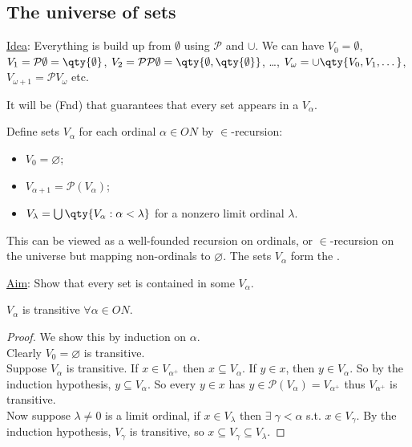 \subsection{The universe of sets}

\underline{Idea}: Everything is build up from $\emptyset$ using $\mathcal{P}$ and $\cup$.
We can have $V_0 = \emptyset$, $V_1 = \mathcal{P} \emptyset = \qty{\emptyset}$, $V_2 = \mathcal{P} \mathcal{P} \emptyset = \qty{\emptyset, \qty{\emptyset}}$, \dots, $V_\omega = \cup \qty{V_0, V_1, \dots}$, $V_{\omega + 1} = \mathcal{P} V_\omega$ etc.

It will be (Fnd) that guarantees that every set appears in a $V_\alpha$.

Define sets $V_\alpha$ for each ordinal $\alpha \in ON$ by $\in$-recursion:
\begin{itemize}
    \item $V_0 = \varnothing$;
    \item $V_{\alpha+1} = \mathcal P(V_\alpha)$;
    \item $V_\lambda = \bigcup \qty{V_\alpha : \alpha < \lambda}$ for a nonzero limit ordinal $\lambda$.
\end{itemize}
This can be viewed as a well-founded recursion on ordinals, or $\in$-recursion on the universe but mapping non-ordinals to $\varnothing$.
The sets $V_\alpha$ form the .

\underline{Aim}: Show that every set is contained in some $V_\alpha$.

\begin{lemma} \label{lem:5-6}
    $V_\alpha$ is transitive $\forall \alpha \in ON$.
\end{lemma}

\begin{proof}
    We show this by induction on $\alpha$. \\
    Clearly $V_0 = \varnothing$ is transitive. \\
    Suppose $V_\alpha$ is transitive.
    If $x \in V_{\alpha^+}$ then $x \subseteq V_\alpha$.
    If $y \in x$, then $y \in V_\alpha$.
    So by the induction hypothesis, $y \subseteq V_\alpha$.
    So every $y \in x$ has $y \in \mathcal{P}(V_\alpha) = V_{\alpha^+}$ thus $V_{\alpha^+}$ is transitive. \\
    Now suppose $\lambda \neq 0$ is a limit ordinal, if $x \in V_\lambda$ then $\exists \; \gamma < \alpha$ s.t. $x \in V_\gamma$.
    By the induction hypothesis, $V_\gamma$ is transitive, so $x \subseteq V_\gamma \subseteq V_\lambda$.
\end{proof}

